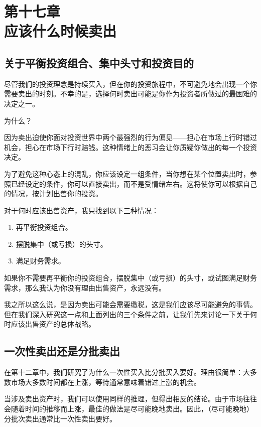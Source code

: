 \section[第十七章\q 应该什么时候卖出]{第十七章\\ 应该什么时候卖出}
\renewcommand{\bookchapter}{17}
\setcounter{figure}{0}
\setcounter{table}{0}

\subsection{关于平衡投资组合、集中头寸和投资目的}

尽管我们的投资理念是持续买入，但在你的投资旅程中，不可避免地会出现一个你需要卖出的时刻。不幸的是，选择何时卖出可能是你作为投资者所做过的最困难的决定之一。

为什么？

因为卖出迫使你面对投资世界中两个最强烈的行为偏见——担心在市场上行时错过机会，担心在市场下行时赔钱。这种情绪上的恶习会让你质疑你做出的每一个投资决定。

为了避免这种心态上的混乱，你应该设定一组条件，当你想在某个位置卖出时，参照已经设定的条件，你可以直接卖出，而不是受情绪左右。这将使你可以根据自己的情况，按计划出售你的投资。

对于何时应该出售资产，我只找到以下三种情况：

\begin{enumerate}
\item 再平衡投资组合。
\item 摆脱集中（或亏损）的头寸。
\item 满足财务需求。
\end{enumerate}

如果你不需要再平衡你的投资组合，摆脱集中（或亏损）的头寸，或试图满足财务需求，那么我认为你没有理由出售资产，永远没有。

我之所以这么说，是因为卖出可能会需要缴税，这是我们应该尽可能避免的事情。但在我们深入研究这一点和上面列出的三个条件之前，让我们先来讨论一下关于何时应该出售资产的总体战略。

\subsection{一次性卖出还是分批卖出}

在第十二章中，我们研究了为什么一次性买入比分批买入要好。理由很简单：大多数市场大多数时间都在上涨，等待通常意味着错过上涨的机会。

当涉及卖出资产时，我们可以使用同样的推理，但得出相反的结论。由于市场往往会随着时间的推移而上涨，最佳的做法是尽可能晚地卖出。因此，（尽可能晚地）分批次卖出通常比一次性卖出要好。

